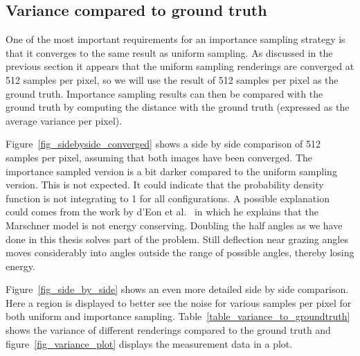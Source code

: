 \documentclass[11pt,a4paper]{report}
\begin{document}
\subsection{Variance compared to ground truth}
\label{variance_comparison_gr_truth}

One of the most important requirements for an importance sampling strategy is that it converges to the same result as uniform sampling. As discussed in the previous section it appears that the uniform sampling renderings are converged at 512 samples per pixel, so we will use the result of 512 samples per pixel as the ground truth. Importance sampling results can then be compared with the ground truth by computing the distance with the ground truth (expressed as the average variance per pixel).

Figure~\ref{fig_sidebyside_converged} shows a side by side comparison of 512 samples per pixel, assuming that both images have been converged. The importance sampled version is a bit darker compared to the uniform sampling version. This is not expected. It could indicate that the probability density function is not integrating to 1 for all configurations. A possible explanation could comes from the work by d'Eon et al.~\cite{eon2011} in which he explains that the Marschner model is not energy conserving. Doubling the half angles as we have done in this thesis solves part of the problem. Still deflection near grazing angles moves considerably into angles outside the range of possible angles, thereby losing energy.

Figure~\ref{fig_side_by_side} shows an even more detailed side by side comparison. Here a region is displayed to better see the noise for various samples per pixel for both uniform and importance sampling. Table~\ref{table_variance_to_groundtruth} shows the variance of different renderings compared to the ground truth and figure~\ref{fig_variance_plot} displays the measurement data in a plot.
\end{document}
